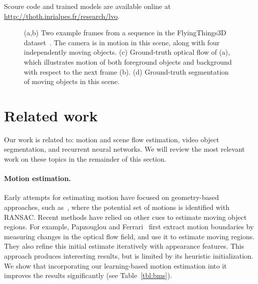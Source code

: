 Scoure code and trained models are  available
online at \url{http://thoth.inrialpes.fr/research/lvo}. 


\begin{figure*}[t]
\begin{center}
\end{center}
\vspace{-0.3cm}\caption{(a,b) Two example frames from a sequence in the
FlyingThings3D dataset~\cite{Mayer16}. The camera is in motion in this scene,
along with four independently moving objects. (c) Ground-truth optical flow of
(a), which illustrates motion of both foreground objects and background with
respect to the next frame (b). (d) Ground-truth segmentation of moving objects
in this scene.}
\label{fig:intro}
\end{figure*}

\section{Related work}
\label{sec:rel}
Our work is related to: motion and scene flow estimation, video object
segmentation, and recurrent neural networks. We will review the most relevant
work on these topics in the remainder of this section.

\paragraph{\bf Motion estimation.} Early attempts for estimating motion have
focused on geometry-based approaches, such as~\cite{Torr98}, where the
potential set of motions is identified with RANSAC. Recent methods have relied
on other cues to estimate moving object regions. For example, Papzouglou and
Ferrari~\cite{papazoglou2013fast} first extract motion boundaries by measuring
changes in the optical flow field, and use it to estimate moving regions.  They
also refine this initial estimate iteratively with appearance features.  This
approach produces interesting results, but is limited by its heuristic
initialization. We show that incorporating our learning-based motion estimation
into it improves the results significantly (see Table~\ref{tbl:bms}).

